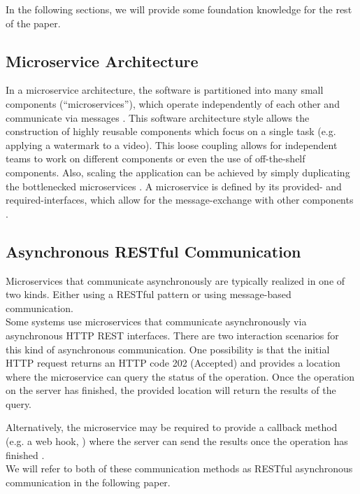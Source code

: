In the following sections, we will provide some foundation knowledge for the rest of the paper.

\subsection{Microservice Architecture}
\label{sec:Foundation:MicroserviceArchitecture}
In a microservice architecture, the software is partitioned into many small components (``microservices''), which operate independently of each other and communicate via messages \cite{Dragoni2017}.
This software architecture style allows the construction of highly reusable components which focus on a single task (e.g. applying a watermark to a video).
This loose coupling allows for independent teams to work on different components or even the use of off-the-shelf components.
Also, scaling the application can be achieved by simply duplicating the bottlenecked microservices \cite{Dragoni2017}.
A microservice is defined by its provided- and required-interfaces, which allow for the message-exchange with other components \cite{Singh2021}.

\subsection{Asynchronous RESTful Communication}
\label{sec:Foundation:AsyncCommunication}
Microservices that communicate asynchronously are typically realized in one of two kinds.
Either using a RESTful pattern or using message-based communication. \\

Some systems use microservices that communicate asynchronously via asynchronous HTTP REST interfaces.
There are two interaction scenarios for this kind of asynchronous communication.
One possibility is that the initial HTTP request returns an HTTP code 202 (Accepted) and provides a location where the microservice can query the status of the operation.
Once the operation on the server has finished, the provided location will return the results of the query. \cite{Mayer2018}

Alternatively, the microservice may be required to provide a callback method (e.g. a web hook, \cite{Webhooks}) where the server can send the results once the operation has finished \cite{Mayer2018}. \\

We will refer to both of these communication methods as RESTful asynchronous communication in the following paper.

